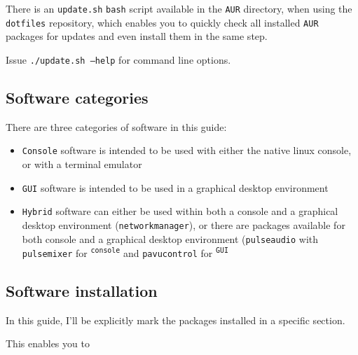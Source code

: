 \documentclass[9pt]{report}
\newenvironment{NOTE}
{\begin{tcolorbox}[colback=admonitionBG,coltitle=draculaFG,colframe=draculaBlue,colbacktitle=draculaBlue,title=NOTE]}
{\end{tcolorbox}}
\begin{document}
\begin{NOTE}
    There is an \texttt{update.sh} \texttt{bash} script available in the \texttt{AUR} directory, when using the \texttt{dotfiles} repository, which enables you to quickly check all installed \texttt{AUR} packages for updates and even install them in the same step.

    Issue \texttt{./update.sh --help} for command line options.
\end{NOTE}

\newpage

\hypertarget{x-software-categories}{\subsection{Software categories}}
There are three categories of software in this guide:


\begin{itemize}

    \item \texttt{Console} software is intended to be used with either the native linux console, or with a terminal emulator

    \item \texttt{GUI} software is intended to be used in a graphical desktop environment

    \item \texttt{Hybrid} software can either be used within both a console and a graphical desktop environment (\texttt{networkmanager}), or there are packages available for both console and a graphical desktop environment (\texttt{pulseaudio} with \texttt{pulsemixer} for \textsuperscript{\texttt{console}} and \texttt{pavucontrol} for \textsuperscript{\texttt{GUI}}

\end{itemize}



\newpage

\hypertarget{x-software-installation}{\subsection{Software installation}}
In this guide, I’ll be explicitly mark the packages installed in a specific section.


This enables you to
\end{document}
